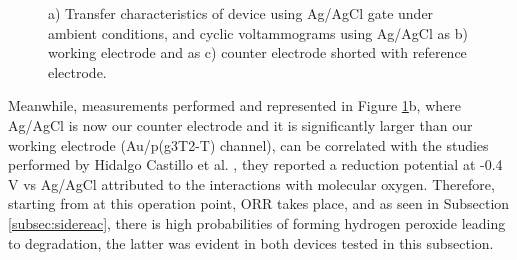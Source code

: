 \begin{figure}[ht]
    \centering 
    \caption[Transfer characteristics and cyclic voltammograms of device using Ag/AgCl gate under ambient conditions]{a) Transfer characteristics of device using Ag/AgCl gate under ambient conditions, and cyclic voltammograms using Ag/AgCl as b) working electrode and as c) counter electrode shorted with reference electrode.}
    \label{fig:DropAgCl}
\end{figure}

Meanwhile, measurements performed and represented in Figure \ref{fig:DropAgCl}b, where Ag/AgCl is now our counter electrode and it is significantly larger than our working electrode (Au/p(g3T2-T) channel), %
can be correlated with the studies performed by Hidalgo Castillo et al. \cite{hidalgocastilloSimultaneousPerformanceStability2022a}, they reported a reduction potential at -0.4 V vs Ag/AgCl attributed to the interactions with molecular oxygen. Therefore, starting from at this operation point, ORR takes place, and as seen in Subsection \ref{subsec:sidereac}, there is high probabilities of forming hydrogen peroxide leading to degradation, the latter was evident in both devices tested in this subsection.

